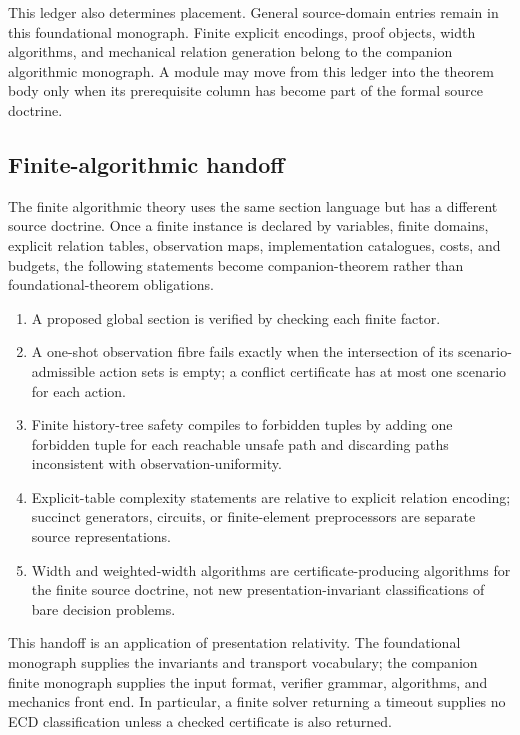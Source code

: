 \documentclass[11pt]{article}
\theoremstyle{plain}
\theoremstyle{definition}
\theoremstyle{remark}
\begin{document}
This ledger also determines placement. General source-domain entries remain in
this foundational monograph. Finite explicit encodings, proof objects, width
algorithms, and mechanical relation generation belong to the companion
algorithmic monograph. A module may move from this ledger into the theorem body
only when its prerequisite column has become part of the formal source doctrine.

\subsection{Finite-algorithmic handoff}
\label{subsec:finite-algorithmic-handoff}

The finite algorithmic theory uses the same section language but has a different
source doctrine. Once a finite instance is declared by variables, finite domains,
explicit relation tables, observation maps, implementation catalogues, costs,
and budgets, the following statements become companion-theorem rather than
foundational-theorem obligations.
\begin{enumerate}[label=(\roman*)]
\item A proposed global section is verified by checking each finite factor.
\item A one-shot observation fibre fails exactly when the intersection of its
scenario-admissible action sets is empty; a conflict certificate has at most one
scenario for each action.
\item Finite history-tree safety compiles to forbidden tuples by adding one
forbidden tuple for each reachable unsafe path and discarding paths inconsistent
with observation-uniformity.
\item Explicit-table complexity statements are relative to explicit relation
encoding; succinct generators, circuits, or finite-element preprocessors are
separate source representations.
\item Width and weighted-width algorithms are certificate-producing algorithms
for the finite source doctrine, not new presentation-invariant classifications of
bare decision problems.
\end{enumerate}

This handoff is an application of presentation relativity. The foundational
monograph supplies the invariants and transport vocabulary; the companion finite
monograph supplies the input format, verifier grammar, algorithms, and mechanics
front end. In particular, a finite solver returning a timeout supplies no ECD
classification unless a checked certificate is also returned.
\end{document}
